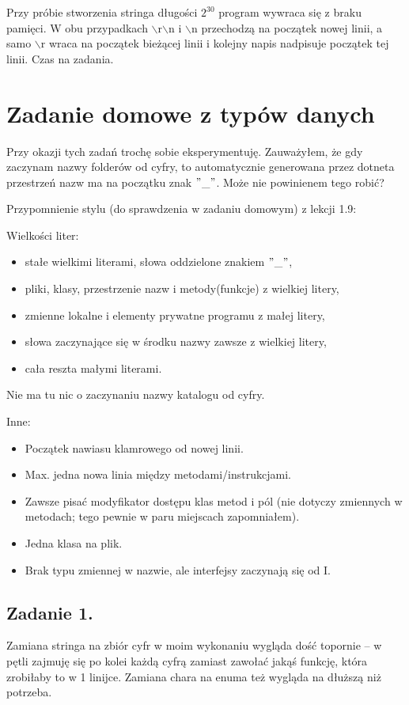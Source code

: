 \documentclass[10pt]{article}
\begin{document}
Przy próbie stworzenia stringa długości $2^{30}$ program wywraca się z braku pamięci. W obu przypadkach $\backslash$r$\backslash$n i $\backslash$n przechodzą na początek nowej linii, a samo $\backslash$r wraca na początek bieżącej linii i kolejny napis nadpisuje początek tej linii. Czas na zadania.

\section{Zadanie domowe z typów danych}
Przy okazji tych zadań trochę sobie eksperymentuję. Zauważyłem, że gdy zaczynam nazwy folderów od cyfry, to automatycznie generowana przez dotneta przestrzeń nazw ma na początku znak $"$\_$"$. Może nie powinienem tego robić?

Przypomnienie stylu (do sprawdzenia w zadaniu domowym) z lekcji 1.9: 

Wielkości liter:
\begin{itemize}
\item stałe wielkimi literami, słowa oddzielone znakiem $"$\_$"$,
\item pliki, klasy, przestrzenie nazw i metody(funkcje) z wielkiej litery,
\item zmienne lokalne i elementy prywatne programu z małej litery,
\item słowa zaczynające się w środku nazwy zawsze z wielkiej litery,
\item cała reszta małymi literami.
\end{itemize}
Nie ma tu nic o zaczynaniu nazwy katalogu od cyfry.

Inne:
\begin{itemize}
\item Początek nawiasu klamrowego od nowej linii.
\item Max. jedna nowa linia między metodami/instrukcjami.
\item Zawsze pisać modyfikator dostępu klas metod i pól (nie dotyczy zmiennych w metodach; tego pewnie w paru miejscach zapomniałem).
\item Jedna klasa na plik.
\item Brak typu zmiennej w nazwie, ale interfejsy zaczynają się od I.
\end{itemize}

\subsection{Zadanie 1.}
Zamiana stringa na zbiór cyfr w moim wykonaniu wygląda dość topornie -- w pętli zajmuję się po kolei każdą cyfrą zamiast zawołać jakąś funkcję, która zrobiłaby to w 1 linijce. Zamiana chara na enuma też wygląda na dłuższą niż potrzeba.
\end{document}
